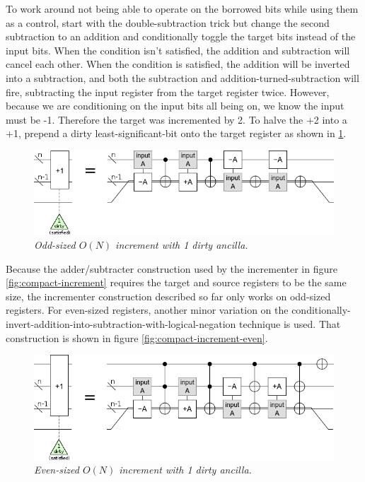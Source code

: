 \documentclass[twocolumn]{article}
\begin{document}
To work around not being able to operate on the borrowed bits while using them as a control, start with the double-subtraction trick but change the second subtraction to an addition and conditionally toggle the target bits instead of the input bits.
When the condition isn't satisfied, the addition and subtraction will cancel each other.
When the condition is satisfied, the addition will be inverted into a subtraction, and both the subtraction and addition-turned-subtraction will fire, subtracting the input register from the target register twice.
However, because we are conditioning on the input bits all being on, we know the input must be -1.
Therefore the target was incremented by 2.
To halve the +2 into a +1, prepend a dirty least-significant-bit onto the target register as shown in \ref{fig:increment-odd}.

\begin{figure}
  \centering
  \includegraphics[width=\linewidth]{assets/increment-odd.png}
  \caption{\em Odd-sized $O(N)$ increment with 1 dirty ancilla.}
  \label{fig:increment-odd}
\end{figure}

Because the adder/subtracter construction used by the incrementer in figure \ref{fig:compact-increment} requires the target and source registers to be the same size, the incrementer construction described so far only works on odd-sized registers.
For even-sized registers, another minor variation on the conditionally-invert-addition-into-subtraction-with-logical-negation technique is used.
That construction is shown in figure \ref{fig:compact-increment-even}.

\begin{figure}
  \centering
  \includegraphics[width=\linewidth]{assets/increment-even.png}
  \caption{\em Even-sized $O(N)$ increment with 1 dirty ancilla.}
  \label{fig:increment-even}
\end{figure}
\end{document}
